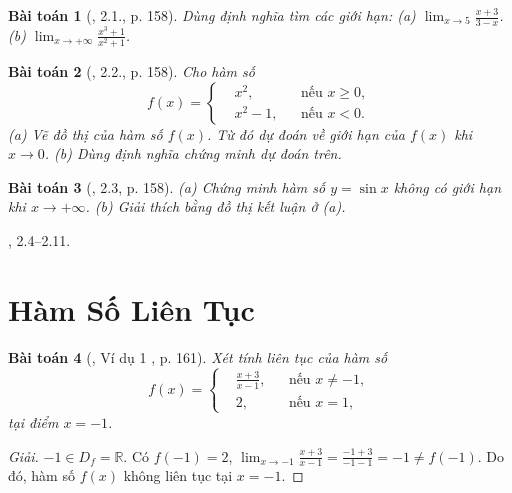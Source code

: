 \documentclass{article}
\newtheorem{baitoan}{Bài toán}
\begin{document}
\begin{baitoan}[\cite{SBT_Toan_11_dai_so_giai_tich_co_ban}, 2.1., p. 158]
	Dùng định nghĩa tìm các giới hạn: (a) $\lim_{x\to5} \frac{x + 3}{3 - x}$. (b) $\lim_{x\to+\infty} \frac{x^3 + 1}{x^2 + 1}$.
\end{baitoan}

\begin{baitoan}[\cite{SBT_Toan_11_dai_so_giai_tich_co_ban}, 2.2., p. 158]
	Cho hàm số
	\begin{equation*}
		f(x) = \left\{\begin{split}
			&x^2,&&\mbox{nếu }x\ge0,\\
			&x^2 - 1,&&\mbox{nếu }x < 0.
		\end{split}\right.
	\end{equation*}
	(a) Vẽ đồ thị của hàm số $f(x)$. Từ đó dự đoán về giới hạn của $f(x)$ khi $x\to0$. (b) Dùng định nghĩa chứng minh dự đoán trên.
\end{baitoan}

\begin{baitoan}[\cite{SBT_Toan_11_dai_so_giai_tich_co_ban}, 2.3, p. 158]	
	(a) Chứng minh hàm số $y = \sin x$ không có giới hạn khi $x\to+\infty$. (b) Giải thích bằng đồ thị kết luận ở (a).
\end{baitoan}
\cite{SBT_Toan_11_dai_so_giai_tich_co_ban}, 2.4--2.11.


\section{Hàm Số Liên Tục}

\begin{baitoan}[\cite{SBT_Toan_11_dai_so_giai_tich_co_ban}, Ví dụ 1 , p. 161]
	Xét tính liên tục của hàm số
	\begin{equation*}
		f(x) = \left\{\begin{split}
			&\frac{x + 3}{x - 1},&&\mbox{nếu }x\ne-1,\\
			&2,&&\mbox{nếu }x = 1,
		\end{split}\right.
	\end{equation*} 
	tại điểm $x = -1$.
\end{baitoan}

\begin{proof}[Giải]
	$-1\in D_f = \mathbb{R}$. Có $f(-1) = 2$, $\lim_{x\to-1} \frac{x + 3}{x - 1} = \frac{-1 + 3}{-1 - 1} = -1\ne f(-1)$. Do đó, hàm số $f(x)$ không liên tục tại $x = -1$.
\end{proof}
\end{document}
